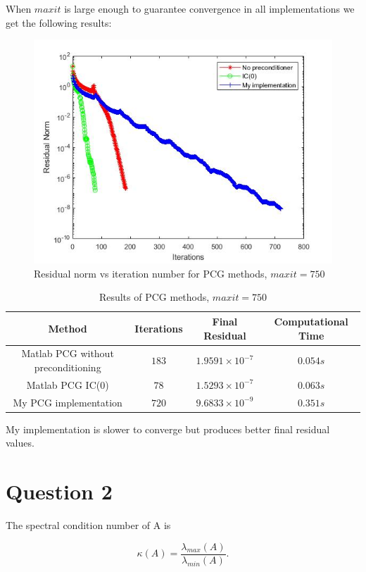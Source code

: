 \documentclass[a4paper, 11pt]{article}
\begin{document}
			When $ maxit $ is large enough to guarantee convergence in all implementations we get the following results:
			\begin{figure}[H]
				\centering
				\includegraphics[width=.6\linewidth]{ex1_it750.jpg}
				\caption{Residual norm vs iteration number for PCG methods, $maxit=750$}
				\label{fig:ex1_it750}
			\end{figure}
		
			\begin{table}[H]
				\centering
				\begin{tabular}{c|c|c|c}
					\textbf{Method} 					&  \textbf{Iterations} 	& \textbf{Final Residual} 		& \textbf{Computational Time} 	\\ \hline
					Matlab PCG without preconditioning	& 			$183$ 		& $ 1.9591 \times 10^{-7} $ 	& $ 0.054 s $					\\ \hline
					Matlab PCG IC(0)					& 			$78$ 		& $ 1.5293 \times 10^{-7} $ 	& $ 0.063 s $					\\ \hline	
					My PCG implementation				& 			$720$		& $ 9.6833 \times 10^{-9} $		& $	0.351 s $					\\
				\end{tabular}
				\caption{Results of PCG methods, $maxit=750$}
				\label{table:ex1_it750}
			\end{table}
			
			My implementation is slower to converge but produces better final residual values.
			
			
		\section*{Question 2}
			The spectral condition number of A is 
			
			\begin{equation}
				\kappa(A) = \frac{\lambda_{max}(A)}{\lambda_{min}(A)}.
			\end{equation}
		
\end{document}
